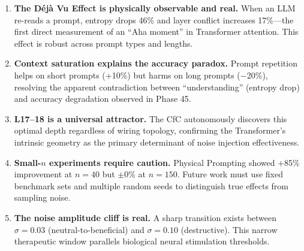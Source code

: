 \documentclass[11pt,a4paper]{article}
\begin{document}
\begin{enumerate}[leftmargin=2em]
\item \textbf{The D\'{e}j\`{a} Vu Effect is physically observable and real.}
When an LLM re-reads a prompt, entropy drops 46\% and layer conflict
increases 17\%---the first direct measurement of an ``Aha moment'' in
Transformer attention. This effect is robust across prompt types and lengths.

\item \textbf{Context saturation explains the accuracy paradox.}
Prompt repetition helps on short prompts (+10\%) but harms on long prompts
($-$20\%), resolving the apparent contradiction between ``understanding'' (entropy
drop) and accuracy degradation observed in Phase 45.

\item \textbf{L17--18 is a universal attractor.}
The CfC autonomously discovers this optimal depth regardless of
wiring topology, confirming the Transformer's intrinsic geometry
as the primary determinant of noise injection effectiveness.

\item \textbf{Small-$n$ experiments require caution.}
Physical Prompting showed +85\% improvement at $n=40$ but $\pm$0\% at $n=150$.
Future work must use fixed benchmark sets and multiple random seeds to
distinguish true effects from sampling noise.

\item \textbf{The noise amplitude cliff is real.}
A sharp transition exists between $\sigma=0.03$ (neutral-to-beneficial)
and $\sigma=0.10$ (destructive). This narrow therapeutic window parallels
biological neural stimulation thresholds.
\end{enumerate}
\end{document}
